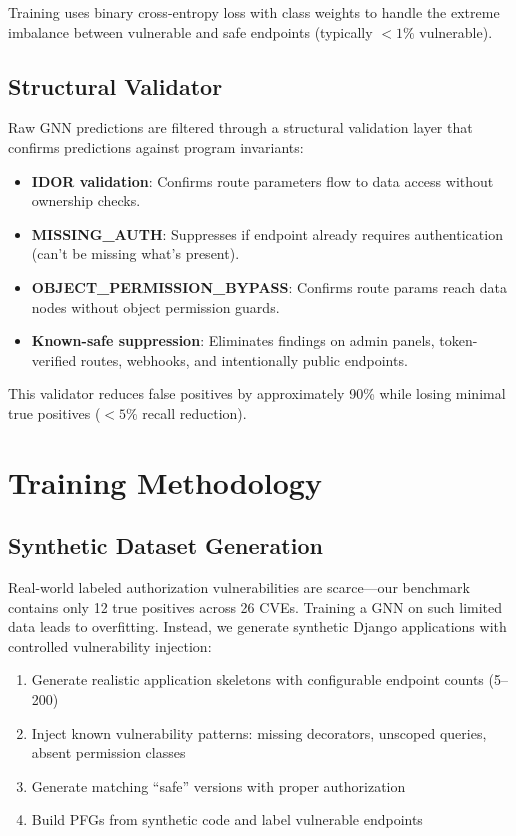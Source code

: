 \documentclass[conference]{IEEEtran}
\begin{document}
Training uses binary cross-entropy loss with class weights to handle the extreme imbalance between vulnerable and safe endpoints (typically $<1\%$ vulnerable).

\subsection{Structural Validator}

Raw GNN predictions are filtered through a structural validation layer that confirms predictions against program invariants:

\begin{itemize}
    \item \textbf{IDOR validation}: Confirms route parameters flow to data access without ownership checks.
    \item \textbf{MISSING\_AUTH}: Suppresses if endpoint already requires authentication (can't be missing what's present).
    \item \textbf{OBJECT\_PERMISSION\_BYPASS}: Confirms route params reach data nodes without object permission guards.
    \item \textbf{Known-safe suppression}: Eliminates findings on admin panels, token-verified routes, webhooks, and intentionally public endpoints.
\end{itemize}

This validator reduces false positives by approximately 90\% while losing minimal true positives ($<5\%$ recall reduction).

\section{Training Methodology}

\subsection{Synthetic Dataset Generation}

Real-world labeled authorization vulnerabilities are scarce—our benchmark contains only 12 true positives across 26 CVEs. Training a GNN on such limited data leads to overfitting. Instead, we generate synthetic Django applications with controlled vulnerability injection:

\begin{enumerate}
    \item Generate realistic application skeletons with configurable endpoint counts (5--200)
    \item Inject known vulnerability patterns: missing decorators, unscoped queries, absent permission classes
    \item Generate matching ``safe'' versions with proper authorization
    \item Build PFGs from synthetic code and label vulnerable endpoints
\end{enumerate}
\end{document}
